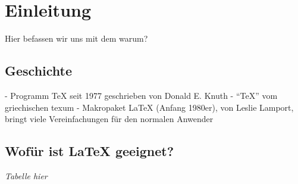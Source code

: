 \section{Einleitung}
Hier befassen wir uns mit dem warum?

\subsection{Geschichte}
- Programm TeX seit 1977 geschrieben von Donald E. Knuth
- "`TeX"' vom griechischen texum
- Makropaket LaTeX (Anfang 1980er), von Leslie Lamport, bringt viele Vereinfachungen für den normalen Anwender


\subsection{Wofür ist LaTeX geeignet?}
\textit{Tabelle hier}
\blindtext
\newpage